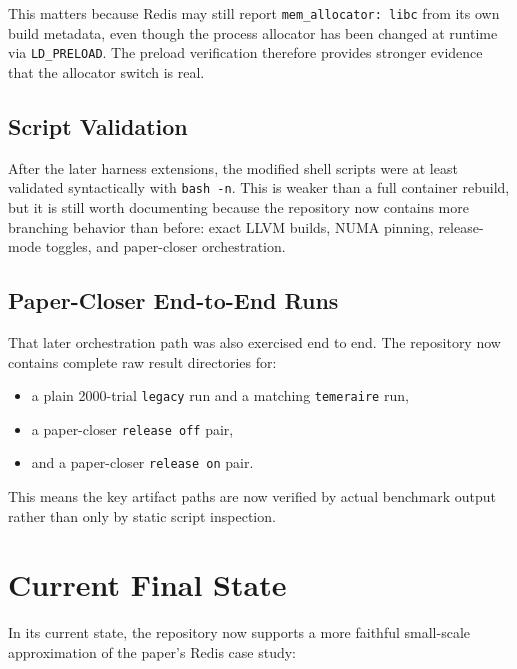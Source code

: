 \documentclass[a4paper,11pt]{article}
\begin{document}
This matters because Redis may still report \texttt{mem\_allocator: libc} from its own build metadata, even though the process allocator has been changed at runtime via \texttt{LD\_PRELOAD}.
The preload verification therefore provides stronger evidence that the allocator switch is real.

\subsection{Script Validation}

After the later harness extensions, the modified shell scripts were at least
validated syntactically with \texttt{bash -n}. This is weaker than a full
container rebuild, but it is still worth documenting because the repository now
contains more branching behavior than before: exact LLVM builds, NUMA pinning,
release-mode toggles, and paper-closer orchestration.

\subsection{Paper-Closer End-to-End Runs}

That later orchestration path was also exercised end to end. The repository now
contains complete raw result directories for:

\begin{itemize}[leftmargin=1.5em]
  \item a plain 2000-trial \texttt{legacy} run and a matching
  \texttt{temeraire} run,
  \item a paper-closer \texttt{release off} pair,
  \item and a paper-closer \texttt{release on} pair.
\end{itemize}

This means the key artifact paths are now verified by actual benchmark output
rather than only by static script inspection.

\section{Current Final State}

In its current state, the repository now supports a more faithful small-scale approximation of the paper's Redis case study:
\end{document}
